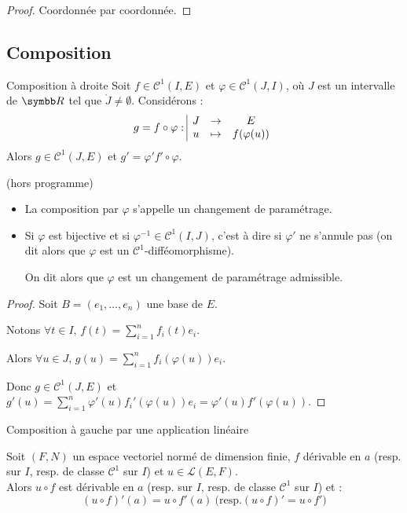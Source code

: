 \begin{proof}
    Coordonnée par coordonnée.
\end{proof}

\subsection{Composition}

\begin{proposition}{Composition à droite}{}
    Soit $f \in \mathscr C^1(I, E)$ et $\varphi \in \mathscr C^1(J, I)$, où $J$ est un intervalle de $\R$
    tel que $\mathring{J } \neq \emptyset$. 
    Considérons :
    \[g = f \circ \varphi: \space \begin{array}{|ccc} \displaystyle J & \to & \displaystyle E \\ \displaystyle u & \mapsto & \displaystyle f(\varphi(u)) \end{array}\]
    Alors $g \in \mathscr C^1(J, E)$ et $g' = \varphi' f' \circ \varphi$.
\end{proposition}

\begin{remarque}
    (hors programme)
    \begin{itemize}
        \item La composition par $\varphi$ s'appelle un changement de paramétrage.

        \item Si $\varphi$ est bijective et si $\varphi^{-1} \in \mathscr C^1(I, J)$, c'est à dire si 
        $\varphi '$ ne s'annule pas (on dit alors que $\varphi$ est un $\mathscr C^1$-difféomorphisme). 

        On dit alors que $\varphi$ est un changement de paramétrage admissible.
    \end{itemize}
\end{remarque}

\begin{proof}
    Soit $B = (e_1, \ldots, e_n)$ une base de $E$. 

    Notons $\displaystyle \forall t \in I, \, f(t) = \sum_{i=1}^n f_i(t)e_i$. 

    Alors $\displaystyle \forall u \in J, \, g(u ) = \sum_{i=1}^n f_i(\varphi(u))e_i$. 

    Donc $g \in \mathscr C^1(J, E)$ et $\displaystyle g'(u) = \sum_{i=1}^n \varphi'(u)f_i'(\varphi(u))e_i = \varphi'(u)f'(\varphi(u))$.
\end{proof}

\begin{theoreme}{Composition à gauche par une application linéaire}{}

    Soit $(F, N)$ un espace vectoriel normé de dimension finie, $f$ dérivable en $a$
    (resp. sur $I$, resp. de classe $\mathscr C^1$ sur $I$) et $u \in \mathscr{L }(E, F)$. \\

    Alors $u \circ f$ est dérivable en $a$ (resp. sur $I$, resp. de classe $\mathscr C^1$ sur $I$) et :
    \[(u \circ f)'(a) = u \circ f'(a)~\text{(resp.} (u \circ f)' = u \circ f'\text{)}\]
\end{theoreme}


